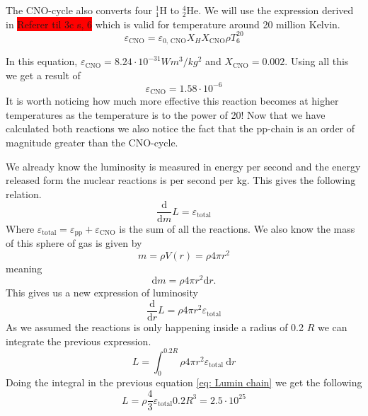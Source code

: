 \documentclass[reprint,english,notitlepage]{revtex4-2}
\begin{document}
The CNO-cycle also converts four $ _{1}^{1}\text{H} $ to $ _{2}^{4}\text{He} $. We will use the expression derived in \colorbox{red}{Referer til 3c s, 6} which is valid for temperature around 20 million Kelvin. 
\begin{equation}\label{eq: CNO-cycle}
  ε_{\text{CNO}} = ε_{\text{0, CNO}}X_{H}X_{\text{CNO}}ρT^{20}_{6}
\end{equation}\newline

In this equation, $ ε_{\text{CNO}} = 8.24 ⋅ 10^{-31}Wm^{3} / kg^{2} $ and $ X_{\text{CNO}} = 0.002 $. Using all this we get a result of 
\begin{equation}\label{eq: E_CNO}
  ε_{\text{CNO}} = 1.58 ⋅ 10^{-6}
\end{equation}
It is worth noticing how much more effective this reaction becomes at higher temperatures as the temperature is to the power of 20! Now that we have calculated both reactions we also notice the fact that the pp-chain is an order of magnitude greater than the CNO-cycle. 

We already know the luminosity is measured in energy per second and the energy released form the nuclear reactions is per second per kg. This gives the following relation. 
\begin{equation}\label{}
  \frac{\mathrm{d}}{\mathrm{d}m} L= ε_{\text{total}}
\end{equation}
Where $ ε_{\text{total}} = ε_{\text{pp}} + ε_{\text{CNO}} $ is the sum of all the reactions. We also know the mass of this sphere of gas is given by 
\[
m = ρV(r) = ρ 4 π r^{2}
\]
meaning 
\[
\mathrm{d}m = ρ 4 π r^{2}\mathrm{d}r. 
\]
This gives us a new expression of luminosity
\begin{equation}\label{}
  \frac{\mathrm{d}}{\mathrm{d}r} L = ρ4 π r^{2} ε_{\text{total}}
\end{equation}
As we assumed the reactions is only happening inside a radius of 0.2 $ R $ we can integrate the previous expression. 
\begin{equation}\label{eq: Lumin chain}
  L = \int_{0}^{0.2R } ρ4 π r^{2} ε_{\text{total}}\ \mathrm{d}r 
\end{equation}
Doing the integral in the previous equation \ref{eq: Lumin chain} we get the following
\begin{equation}\label{eq: Lumin chain final }
  L = ρ \frac{4}{3} ε_{\text{total}} 0.2R^{3} = 2.5 ⋅ 10^{25}
\end{equation}
\end{document}
